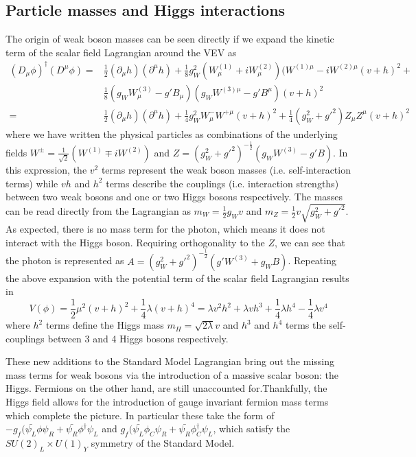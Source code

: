 \subsection{Particle masses and Higgs interactions}

The origin of weak boson masses can be seen directly if we expand the kinetic term of the scalar field 
Lagrangian around the VEV as
\begin{equation}
\begin{aligned}
(D_{\mu}\phi)^{\dagger}(D^{\mu}\phi) =& \frac{1}{2}(\partial_{\mu}h)(\partial^{\mu}h) + 
\frac{1}{8}g_W^2(W_{\mu}^{(1)} + iW_{\mu}^{(2)})(W^{(1)\mu} - iW^{(2)\mu}(v+h)^2 + \\
&\frac{1}{8}(g_WW_{\mu}^{(3)} - g'B_{\mu})(g_WW^{(3)\mu} - g'B^{\mu})(v+h)^2 \\
=&\frac{1}{2}(\partial_{\mu}h)(\partial^{\mu}h) + \frac{1}{4}g_W^2W_{\mu}^-W^{+\mu}(v+h)^2 + 
\frac{1}{4}(g_W^2+g'^2)Z_{\mu}Z^{\mu}(v+h)^2
\end{aligned}
\end{equation}
where we have written the physical particles as combinations of the underlying fields 
$W^{\pm} = \frac{1}{\sqrt{2}}(W^{(1)} \mp iW^{(2)})$ and 
$Z = (g^2_W + g'^2)^{-\frac{1}{2}}(g_WW^{(3)} - g'B)$. In this expression,  the $v^2$ terms represent 
the weak boson masses (i.e. self-interaction terms) while $vh$ and $h^2$ terms describe the couplings 
(i.e. interaction strengths) between two weak bosons and one or two Higgs bosons respectively. The masses 
can be read directly from the Lagrangian as $m_W = \frac{1}{2}g_Wv$ and 
$m_Z = \frac{1}{2}v\sqrt{g^2_W + g'^2}$. As expected, there is no mass term for the photon, which means 
it does not interact with the Higgs boson. Requiring orthogonality to the $Z$, we can see that the photon is 
represented as $A = (g^2_W + g'^2)^{-\frac{1}{2}}(g'W^{(3)} + g_WB)$. Repeating the above expansion 
with the potential term of the scalar field Lagrangian results in 
\begin{equation}
V(\phi) = \frac{1}{2}\mu^2(v+h)^2 + \frac{1}{4}\lambda(v+h)^4 = 
\lambda v^2h^2 + \lambda vh^3 + \frac{1}{4}\lambda h^4 - \frac{1}{4}\lambda v^4
\end{equation}
where $h^2$ terms define the Higgs mass $m_H = \sqrt{2\lambda}v$ and $h^3$ and $h^4$ terms the 
self-couplings between 3 and 4 Higgs bosons respectively. \par

These new additions to the Standard Model Lagrangian bring out the missing mass terms for weak bosons 
via the introduction of a massive scalar boson: the Higgs. Fermions on the other hand, are still unaccounted 
for.Thankfully, the Higgs field allows for the introduction of gauge invariant fermion mass terms which 
complete the picture. In particular these take the form of 
$-g_f(\bar{\psi_L}\phi\psi_R + \bar{\psi_R}\phi^{\dagger}\psi_L$ and 
$g_f(\bar{\psi_L}\phi_C\psi_R + \bar{\psi_R}\phi_C^{\dagger}\psi_L$, which satisfy the 
$SU(2)_L \times U(1)_Y$ symmetry of the Standard Model.

